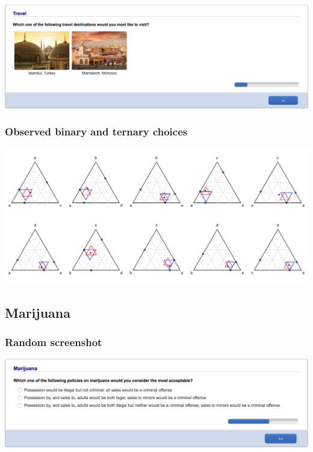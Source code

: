 \documentclass[11pt,letter]{article}
\begin{document}
\includegraphics[width=15cm]{Population_study_design/screenshot_travel.png}

\subsubsection*{Observed binary and ternary choices}

\includegraphics[width=15cm]{./Population_study_data/Simplexes/travel.pdf}

\pagebreak

\subsection*{Marijuana}



\subsubsection*{Random screenshot}

\includegraphics[width=15cm]{Population_study_design/screenshot_marijuana.png}
\end{document}
